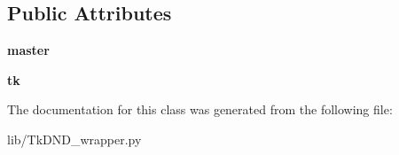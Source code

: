 \subsection*{Public Attributes}
\begin{DoxyCompactItemize}
\item 
\mbox{\label{class_python_01_g_u_i_1_1lib_1_1_tk_d_n_d__wrapper_1_1_tk_d_n_d_a89f2496b90923781250b3c7c95e7be7f}} 
{\bfseries master}
\item 
\mbox{\label{class_python_01_g_u_i_1_1lib_1_1_tk_d_n_d__wrapper_1_1_tk_d_n_d_a851fa5bd680debeaf54c66c72361363c}} 
{\bfseries tk}
\end{DoxyCompactItemize}


The documentation for this class was generated from the following file\+:\begin{DoxyCompactItemize}
\item 
lib/Tk\+D\+N\+D\+\_\+wrapper.\+py\end{DoxyCompactItemize}
